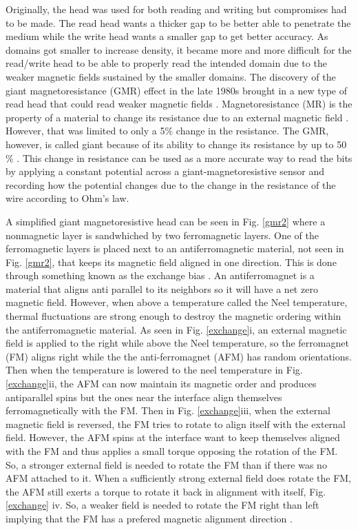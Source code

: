 \documentclass[ notitlepage, numerical, 11pt]{revtex4-1} %
\begin{document}
Originally, the head was used for both reading and writing but compromises had to be made. The read head wants a thicker gap to be better able to penetrate the medium while the write head wants a smaller gap to get better accuracy. As domains got smaller to increase density, it became more and more difficult for the read/write head to be able to properly read the intended domain due to the weaker magnetic fields sustained by the smaller domains. The discovery of the giant magnetoresistance (GMR) effect in the late 1980s brought in a new type of read head that could read weaker magnetic fields \cite{gmr}. Magnetoresistance (MR) is the property of a material to change its resistance due to an external magnetic field \cite{gmr}. However, that was limited to only a 5$\%$ change in the resistance. The GMR, however, is called giant because of its ability to change its resistance by up to 50$\%$ \cite{newGmr}. This change in resistance can be used as a more accurate way to read the bits by applying a constant potential across a giant-magnetoresistive sensor and recording how the potential changes due to the change in the resistance of the wire according to Ohm's law. 

A simplified giant magnetoresistive head can be seen in Fig. \ref{gmr2} where a nonmagnetic layer is sandwhiched by two ferromagnetic layers. One of the ferromagnetic layers is placed next to an antiferromagnetic material, not seen in Fig. \ref{gmr2}, that keeps its magnetic field aligned in one direction. This is done through something known as the exchange bias \cite{schull}. An antiferromagnet is a material that aligns anti parallel to its neighbors so it will have a net zero magnetic field. However, when above a temperature called the Neel temperature, thermal fluctuations are strong enough to destroy the magnetic ordering within the antiferromagnetic material. As seen in Fig. \ref{exchange}i, an external magnetic field is applied to the right while above the Neel temperature, so the ferromagnet (FM) aligns right while the the anti-ferromagnet (AFM) has random orientations. Then when the temperature is lowered to the neel temperature in Fig. \ref{exchange}ii, the AFM can now maintain its magnetic order and produces antiparallel spins but the ones near the interface align themselves ferromagnetically with the FM. Then in Fig. \ref{exchange}iii, when the external magnetic field is reversed, the FM tries to rotate to align itself with the external field. However, the AFM spins at the interface want to keep themselves aligned with the FM and thus applies a small torque opposing the rotation of the FM. So, a stronger external field is needed to rotate the FM than if there was no AFM attached to it. When a sufficiently strong external field does rotate the FM, the AFM still exerts a torque to rotate it back in alignment with itself, Fig. \ref{exchange} iv. So, a weaker field is needed to rotate the FM right than left implying that the FM has a prefered magnetic alignment direction \cite{schull}.
\end{document}
